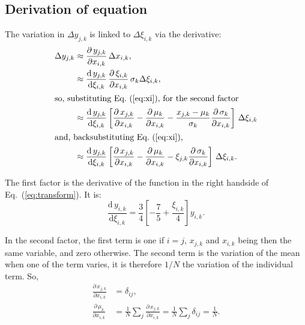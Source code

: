 \documentclass[twocolumn]{article}
\def\der#1#2{\frac{\mathrm{d}\,{#1}}{\mathrm{d}#2}}
\def\pder#1#2{\frac{\partial\,{#1}}{\partial#2}}
\def\eqref#1{Eq.~(\ref{eq:#1})}
\begin{document}
\subsection{Derivation of equation}
\label{sec:calculus}
The variation in $\Delta y_{j,k}$ is linked to $\Delta \xi_{i,k}$ via the
derivative:
\begin{align}
    \Delta y_{j,k} 
        &\approx \pder{y_{j,k}}{x_{i,k}}
                 \, \Delta x_{i,k},\\
        &\approx \der{y_{j,k}}{\xi_{i,k}}
                 \, \pder{\xi_{i,k}}{x_{i,k}}
                 \, \sigma_k \Delta \xi_{i,k},\\
\intertext{so, substituting \eqref{xi}, for the second factor}
        &\approx \der{y_{j,k}}{\xi_{i,k}}
                 \left[
                    \pder{x_{j,k}}{x_{i,k}}
                  - \pder{\mu_k}{x_{i,k}} 
                  - \frac{x_{j,k}-\mu_k}{\sigma_k}\pder{\sigma_k}{x_{i,k}} 
                 \right] 
                 \, \Delta \xi_{i,k}\\
\intertext{and, backsubstituting \eqref{xi},}
        &\approx \der{y_{j,k}}{\xi_{i,k}}
                 \left[
                    \pder{x_{j,k}}{x_{i,k}}
                  - \pder{\mu_k}{x_{i,k}}
                  - \xi_{j,k} \pder{\sigma_k}{x_{i,k}}
                 \right]
                 \, \Delta \xi_{i,k}.
\end{align}

The first factor is the derivative of the function in the right handside of Eq.~(\ref{eq:transform}). It is:
\begin{equation}
    \der{y_{i,k}}{\xi_{i,k}} = \frac34 \left[ -\frac75 + \frac{\xi_{i,k}}4 \right] y_{i,k}.
\end{equation}

In the second factor, the first term is one if $i = j$, $x_{j,k}$ and $x_{i,k}$ being then the same variable, and zero otherwise.  The second term is the variation of the mean when one of the term varies, it is therefore $1/N$ the variation of the individual term. So,
\begin{align}
    \pder{x_{j,k}}{x_{i,k}} &= \delta_{ij}, \label{eq:derx}\\
    \pder{\mu_k}{x_{i,k}}   &= \frac 1N \sum_j \pder{x_{j,k}}{x_{i,k}}
                             = \frac 1N \sum_j \delta_{ij}
                             = \frac 1N. \label{eq:dermu}
\end{align}
\end{document}
